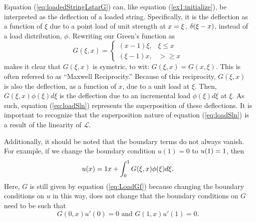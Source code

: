     Equation (\ref{eq:loadedStringLstarG}) can, like equation (\ref{ex1:initialize}), be interpreted as the deflection of a loaded string. Specifically, it is the deflection as a function of \(\xi\) due to a point load of unit strength at \(x=\xi\), \(\delta(\xi-x)\), instead of a load distribution, \(\phi\). Rewriting our Green's function as
    \begin{equation}
        G(\xi,x)= \begin{cases}
            (x-1)\xi, & \xi \leq x\\
            (\xi-1)x, & > \geq x
        \end{cases}
    \end{equation}
    makes it clear that \(G(\xi,x)\) is symetric, to wit: \(G(\xi,x)=G(x,\xi)\). This is often referred to as ``Maxwell Reciprocity.'' Because of this reciprocity, \(G(\xi,x)\) is also the deflection, as a function of \(x\), due to a unit load at \(\xi\). Then, \(G(\xi,x)\phi(\xi)d\xi\) is the deflection due to an incremental load \(\phi(\xi)d\xi\) at \(\xi\). As such, equation (\ref{eq:loadSln}) represents the superposition of these deflections. It is important to recognize that the superposition nature of equation (\ref{eq:loadSln}) is a result of the linearity of \(\mathcal{L}\).

    Additionally, it should be noted that the boundary terms do not always vanish. For example, if we change the boundary condition \(u(1)=0\) to \(u(1)=1\), then
    \begin{equation*}
        u(x)=1 x + \int_{0}^{1} G(\xi,x)\phi(\xi)d\xi.
    \end{equation*}
    Here, \(G\) is still given by equation (\ref{eq:LoadGf}) because changing the boundary conditions on \(u\) in this way, does not change that the boundary conditions on \(G\) need to be such that 
    \begin{equation*}
        G(0,x)u'(0) = 0 \text{ and } G(1,x)u'(1)=0.
    \end{equation*}

